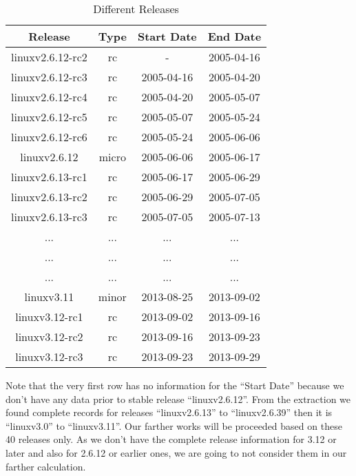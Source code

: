 \documentclass{acm_proc_article-sp}
\begin{document}
\begin{table}[ht]
\caption{Different Releases}  %
\centering 						%
\begin{tabular}{c c c c}				%
\hline\hline						%
Release & Type & Start Date & End Date \\ [0.5ex]
\hline 							%
linuxv2.6.12-rc2 & rc       & - & 2005-04-16 \\
linuxv2.6.12-rc3 & rc       & 2005-04-16 & 2005-04-20 \\
linuxv2.6.12-rc4 & rc       & 2005-04-20 & 2005-05-07 \\
linuxv2.6.12-rc5 & rc       & 2005-05-07 & 2005-05-24 \\
linuxv2.6.12-rc6 & rc       & 2005-05-24 & 2005-06-06 \\
linuxv2.6.12        & micro & 2005-06-06 & 2005-06-17 \\
linuxv2.6.13-rc1 & rc       & 2005-06-17 & 2005-06-29 \\
linuxv2.6.13-rc2 & rc       & 2005-06-29 & 2005-07-05 \\
linuxv2.6.13-rc3 & rc       & 2005-07-05 & 2005-07-13 \\
...			     & ...	   & ... 		     & ...\\
...			     & ...	   & ... 		     & ... \\
...			     & ...	   & ... 		     & ... \\
linuxv3.11            & minor & 2013-08-25 & 2013-09-02 \\
linuxv3.12-rc1     & rc       & 2013-09-02 & 2013-09-16 \\
linuxv3.12-rc2     & rc       & 2013-09-16 & 2013-09-23 \\
linuxv3.12-rc3     & rc       & 2013-09-23 & 2013-09-29 \\
[1ex]							%
\hline 							%
\end{tabular}
\label{table:nonlin} 				%
\end{table}

Note that the very first row has no information for the ``Start Date'' because we don't have any data prior to stable release ``linuxv2.6.12''. From the extraction we found complete records for releases ``linuxv2.6.13'' to ``linuxv2.6.39'' then it is ``linuxv3.0'' to ``linuxv3.11''. Our farther works will be proceeded based on these 40 releases only. As we don't have the complete release information for 3.12 or later and also for 2.6.12 or earlier ones, we are going to not consider them in our farther calculation.
\end{document}
